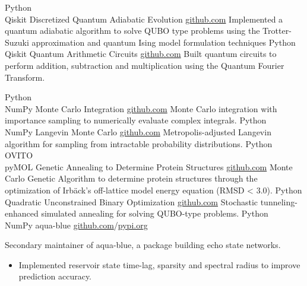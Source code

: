 \documentclass[9pt]{developercv} %
\begin{document}
\begin{entrylist}
	\entry
		{Python \\ Qiskit}
		{Discretized Quantum Adiabatic Evolution}
		{\href{https://github.com/lonelyneutrin0/Adiabatic-Quantum-Computation}{github.com}}
		{Implemented a quantum adiabatic algorithm to solve QUBO type problems using the Trotter-Suzuki approximation and quantum Ising model formulation techniques}
	\entry 
		{Python \\ Qiskit}
		{Quantum Arithmetic Circuits}
		{\href{https://github.com/lonelyneutrin0/Quantum-Arithmetic-Circuits}{github.com}}	
		{Built quantum circuits to perform addition, subtraction and multiplication using the Quantum Fourier Transform.}	
	
	\entry
		{Python \\ NumPy}
		{Monte Carlo Integration}
		{\href{https://github.com/lonelyneutrin0/MNI}{github.com}}
		{Monte Carlo integration with importance sampling to numerically evaluate complex integrals.}
	\entry
		{Python \\ NumPy}
		{Langevin Monte Carlo}
		{\href{https://github.com/lonelyneutrin0/Metropolis-Langevin-Algorithm}{github.com}}
		{Metropolis-adjusted Langevin algorithm for sampling from intractable probability distributions.}
	\entry
		{Python \\ OVITO \\ pyMOL }
		{Genetic Annealing to Determine Protein Structures}
		{\href{https://github.com/lonelyneutrin0/Protein-Structure-Prediction}{github.com}}
		{Monte Carlo Genetic Algorithm to determine protein structures through the optimization of Irbäck's off-lattice model energy equation (RMSD < 3.0).}	
	\entry
		{Python}
		{Quadratic Unconstrained Binary Optimization}
		{\href{https://github.com/lonelyneutrin0/qubo}{github.com}}
		{Stochastic tunneling-enhanced simulated annealing for solving QUBO-type problems.}
	\entry
		{Python \\ NumPy}
		{aqua-blue}
		{\href{https://github.com/jwjeffr/aqua-blue}{github.com}/\href{https://pypi.org/project/aqua-blue/}{pypi.org}}
		{Secondary maintainer of aqua-blue, a package building echo state networks.
		\begin{itemize}[noitemsep,topsep=0pt,parsep=0pt,partopsep=0pt, leftmargin=7pt]
		\item Implemented reservoir state time-lag, sparsity and spectral radius to improve prediction accuracy.

\end{itemize}}
\end{entrylist}
\end{document}
